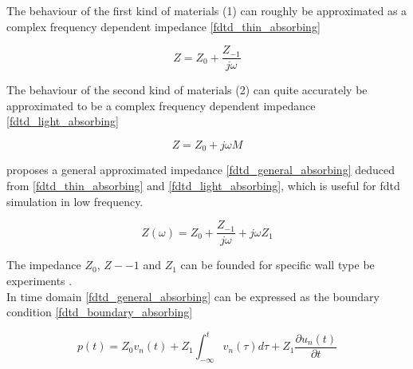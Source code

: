 The behaviour of the first kind of materials (1) can roughly be approximated as a complex frequency dependent impedance \autoref{fdtd_thin_absorbing}

\begin{equation}\label{fdtd_thin_absorbing}
Z= Z_0+\frac{Z_{-1}}{j\omega}
\end{equation}

         \startexplain
    \stopexplain

The behaviour of the second kind of materials (2) can quite accurately be approximated to be a complex frequency dependent impedance \autoref{fdtd_light_absorbing}

\begin{equation}\label{fdtd_light_absorbing}
Z= Z_0+j\omega M
\end{equation}

         \startexplain
    \stopexplain

 \citep{finiteproblems} proposes a general approximated impedance \autoref{fdtd_general_absorbing} deduced from \autoref{fdtd_thin_absorbing} and \autoref{fdtd_light_absorbing}, which is useful for \gls{fdtd} simulation in low frequency. 

\begin{equation}\label{fdtd_general_absorbing}
Z(\omega)= Z_0+\frac{Z_{-1}}{j\omega}+j\omega Z_1
\end{equation}

         \startexplain
    \stopexplain

The impedance $Z_0$, $Z-{-1}$ and $Z_1$ can be founded for specific wall type be experiments \citep{finiteproblems}. \\


In time domain \autoref{fdtd_general_absorbing} can be expressed as the boundary condition \autoref{fdtd_boundary_absorbing}

\begin{equation}\label{fdtd_boundary_absorbing}
p(t)= Z_0v_n(t)+Z_1\int_{-\infty}^{t} v_n(\tau)d\tau +Z_1\frac{\partial u_n(t)}{\partial t} 
\end{equation}

